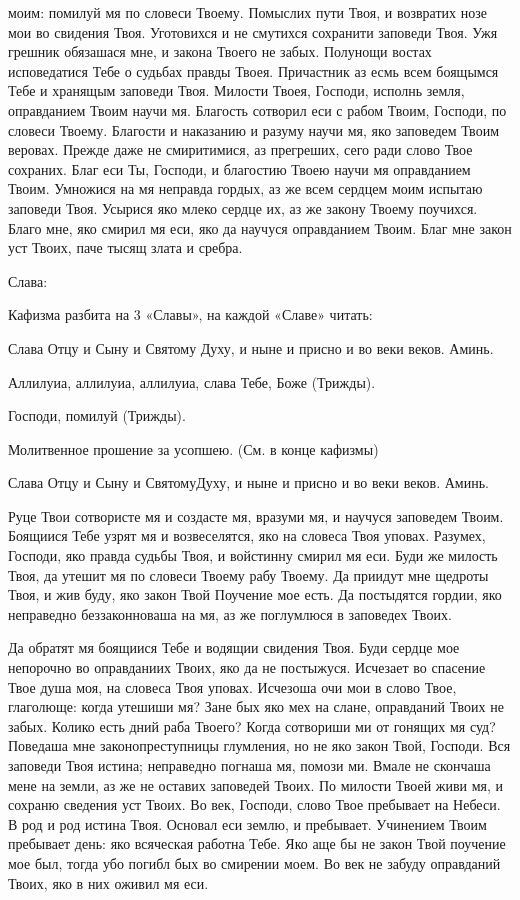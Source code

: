 моим: помилуй мя по словеси Твоему. Помыслих пути Твоя, и возвратих нозе мои во свидения Твоя. Уготовихся и не смутихся сохранити заповеди Твоя. Ужя грешник обязашася мне, и закона Твоего не забых. Полунощи востах исповедатися Тебе о судьбах правды Твоея. Причастник аз есмь всем боящымся Тебе и хранящым заповеди Твоя. Милости Твоея, Господи, исполнь земля, оправданием Твоим научи мя. Благость сотворил еси с рабом Твоим, Господи, по словеси Твоему. Благости и наказанию и разуму научи мя, яко заповедем Твоим веровах. Прежде даже не смиритимися, аз прегреших, сего ради слово Твое сохраних. Благ еси Ты, Господи, и благостию Твоею научи мя оправданием Твоим. Умножися на мя неправда гордых, аз же всем сердцем моим испытаю заповеди Твоя. Усырися яко млеко сердце их, аз же закону Твоему поучихся. Благо мне, яко смирил мя еси, яко да научуся оправданием Твоим. Благ мне закон уст Твоих, паче тысящ злата и сребра. 

Слава: 

Кафизма разбита на 3 «Славы», на каждой «Славе» читать: 

Слава Отцу и Сыну и Святому Духу, и ныне и присно и во веки веков. Аминь. 

Аллилуиа, аллилуиа, аллилуиа, слава Тебе, Боже (Трижды). 

Господи, помилуй (Трижды). 

Молитвенное прошение за усопшею. (См. в конце кафизмы) 

Слава Отцу и Сыну и СвятомуДуху, и ныне и присно и во веки веков. Аминь. 

Руце Твои сотвористе мя и создасте мя, вразуми мя, и научуся заповедем Твоим. Боящиися Тебе узрят мя и возвеселятся, яко на словеса Твоя уповах. Разумех, Господи, яко правда судьбы Твоя, и войстинну смирил мя еси. Буди же милость Твоя, да утешит мя по словеси Твоему рабу Твоему. Да приидут мне щедроты Твоя, и жив буду, яко закон Твой Поучение мое есть. Да постыдятся гордии, яко неправедно беззаконноваша на мя, аз же поглумлюся в заповедех Твоих. 

Да обратят мя боящиися Тебе и водящии свидения Твоя. Буди сердце мое непорочно во оправданиих Твоих, яко да не постыжуся. Исчезает во спасение Твое душа моя, на словеса Твоя уповах. Исчезоша очи мои в слово Твое, глаголюще: когда утешиши мя? Зане бых яко мех на слане, оправданий Твоих не забых. Колико есть дний раба Твоего? Когда сотвориши ми от гонящих мя суд? Поведаша мне законопреступницы глумления, но не яко закон Твой, Господи. Вся заповеди Твоя истина; неправедно погнаша мя, помози ми. Вмале не скончаша мене на земли, аз же не оставих заповедей Твоих. По милости Твоей живи мя, и сохраню сведения уст Твоих. Во век, Господи, слово Твое пребывает на Небеси. В род и род истина Твоя. Основал еси землю, и пребывает. Учинением Твоим пребывает день: яко всяческая работна Тебе. Яко аще бы не закон Твой поучение мое был, тогда убо погибл бых во смирении моем. Во век не забуду оправданий Твоих, яко в них оживил мя еси. 

